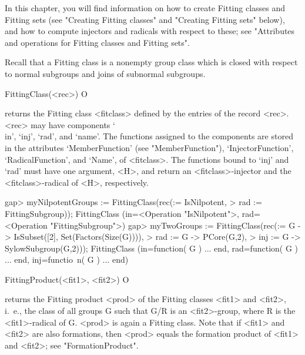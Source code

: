 
In this chapter, you will find information on how to create 
Fitting classes and Fitting sets (see "Creating Fitting classes" and
"Creating Fitting sets" below), and how to compute injectors and radicals
with respect to these;  see "Attributes and operations for Fitting classes
and Fitting sets".



Recall that a Fitting class is a nonempty group class which is closed with respect
to normal subgroups and joins of subnormal subgroups.

\>FittingClass(<rec>) O

returns the Fitting class <fitclass> defined by the entries of the record
<rec>. <rec> may have components `\\in', `inj', `rad', and `name'. The
functions assigned to the components are stored in the attributes
`MemberFunction' (see "MemberFunction"), `InjectorFunction',
`RadicalFunction', and `Name', of <fitclass>. The functions bound to `inj' and
`rad' must have one argument, <H>, and return an <fitclass>-injector and the
<fitclass>-radical of <H>, respectively.


\beginexample
gap> myNilpotentGroups := FittingClass(rec(\in := IsNilpotent,
>    rad := FittingSubgroup));
FittingClass (in=<Operation "IsNilpotent">, rad=<Operation "FittingSubgroup">) 
gap> myTwoGroups := FittingClass(rec(\in := G -> IsSubset([2], Set(Factors(Size(G)))),
>    rad :=  G -> PCore(G,2),
>    inj := G -> SylowSubgroup(G,2)));
FittingClass (in=function( G ) ... end, rad=function( G ) ... end, inj=functio\
n( G ) ... end)
\endexample

\>FittingProduct(<fit1>, <fit2>) O

returns the Fitting product <prod> of the Fitting classes <fit1> and <fit2>,
i.~e., the class of all groups G such that G/R is  an <fit2>-group, where R
is the <fit1>-radical of G.  <prod> is again a Fitting class.
Note that if <fit1> and <fit2> are also
formations, then <prod> equals the
formation product of <fit1> and <fit2>; see "FormationProduct".

